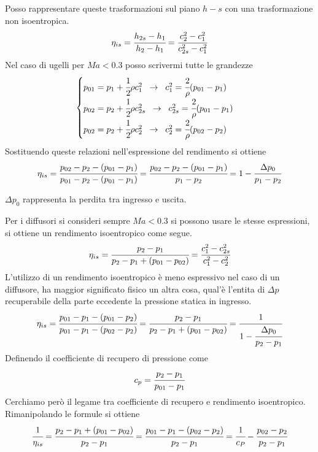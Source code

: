 Posso rappresentare queste trasformazioni sul piano $h-s$ con una trasformazione non isoentropica. 
\begin{equation}
\eta_{is} = \cfrac{h_{2s} - h_1}{h_2-h_1} = \cfrac{c_2^2 - c_1^2}{c_{2s}^2 - c_1^2}
\end{equation}
Nel caso di ugelli per $Ma < 0.3$ posso scrivermi tutte le grandezze
\begin{equation}
\begin{cases}
p_{01} = p_1 + \cfrac{1}{2} \rho c_1^2 \;\; \to  \;\; c_1^2 = \cfrac{2}{\rho} (p_{01} - p_1)\\
p_{02} = p_2 + \cfrac{1}{2} \rho c_{2s}^2 \;\; \to  \;\; c_{2s}^2 = \cfrac{2}{\rho} (p_{01} - p_1)\\
p_{02} = p_2 + \cfrac{1}{2} \rho c_2^2 \;\; \to  \;\; c_2^2 = \cfrac{2}{\rho} (p_{02} - p_2)
\end{cases}
\end{equation}
Sostituendo queste relazioni nell'espressione del rendimento si ottiene
\begin{equation}
\eta_{is} = \cfrac{p_{02} - p_2 - (p_{01} - p_1)}{p_{01} - p_2 - (p_{01} - p_1)}=\cfrac{p_{02} - p_2 -(p_{01} - p_1)}{p_1-p_2}=1- \cfrac{\Delta p_0}{p_1 - p_2}
\end{equation}

$\Delta p_0$ rappresenta la perdita tra ingresso e uscita. 

Per i diffusori si consideri sempre $Ma<0.3$ si possono usare le stesse espressioni, si ottiene un rendimento isoentropico come segue.
\begin{equation}
\eta_{is} = \cfrac{p_2 - p_1}{p_2-p_1 + (p_{01}-p_{02})} = \cfrac{c_1^2 - c_{2s}^2}{c_1^2 - c_2^2}
\end{equation}
L'utilizzo di un rendimento isoentropico è meno espressivo nel caso di un diffusore, ha maggior significato fisico un altra cosa, qual'è l'entita di $ \Delta p$ recuperabile della parte eccedente la pressione statica in ingresso.
\begin{equation}
\eta_{is} = \cfrac{p_{01} - p_1 - (p_{01} - p_2)}{p_{01} - p_1-(p_{02} - p_2)} = \cfrac{p_2 - p_1}{p_2 - p_1 + (p_{01} - p_{02})} = \cfrac{1}{1- \cfrac{\Delta p_0}{p_2 - p_1}}
\end{equation}
Definendo il coefficiente di recupero di pressione come
\begin{equation}
c_p = \cfrac{p_2 - p_1}{p_{01} - p_1}
\end{equation}
Cerchiamo però il legame tra coefficiente di recupero e rendimento isoentropico. Rimanipolando le formule si ottiene
\begin{equation}
\cfrac{1}{\eta_{is}} = \cfrac{p_2 - p_1 + (p_{01} - p_{02})}{p_2 - p_1} = \cfrac{p_{01} - p_1 - (p_{02} - p_2)}{p_2-p_1} = \cfrac{1}{c_P} - \cfrac{p_{02} - p_2}{p_2 - p_1}
\end{equation}

